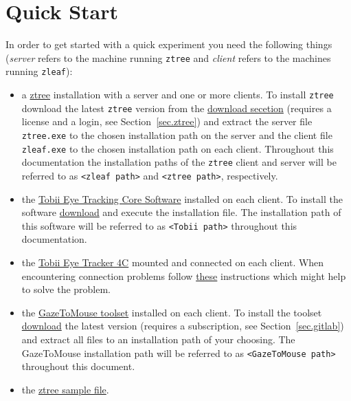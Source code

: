 \documentclass[a4paper,oneside]{book}
\begin{document}
\chapter{Quick Start}
\label{sec.quick}
In order to get started with a quick experiment you need the following things (\emph{server} refers to the machine running \texttt{ztree} and \emph{client} refers to the machines running \texttt{zleaf}):
\begin{itemize}
    \item a \href{http://www.ztree.uzh.ch/en.html}{ztree} installation with a server and one or more clients.
        To install \texttt{ztree} download the latest \texttt{ztree} version from the \href{https://www.uzh.ch/ztree/ssl-dir/index.php}{download secetion} (requires a license and a login, see Section~\ref{sec.ztree}) and extract the server file \texttt{ztree.exe} to the chosen installation path on the server and the client file \texttt{zleaf.exe} to the chosen installation path on each client.
        Throughout this documentation the installation paths of the \texttt{ztree} client and server will be referred to as \texttt{<zleaf path>} and \texttt{<ztree path>}, respectively.
    \item the \href{https://tobiigaming.com/getstarted/}{Tobii Eye Tracking Core Software} installed on each client.
        To install the software \href{https://tobiigaming.com/downloadlatest/?bundle=tobii-core}{download} and execute the installation file.
        The installation path of this software will be referred to as \texttt{<Tobii path>} throughout this documentation.
    \item the \href{https://tobiigaming.com/eye-tracker-4c/}{Tobii Eye Tracker 4C} mounted and connected on each client.
        When encountering connection problems follow \href{https://help.tobii.com/hc/en-us/articles/115000432589-Is-your-Eye-Tracker-4C-not-connecting-}{these} instructions which might help to solve the problem.
    \item the \href{http://tpf.fluido.as:10012/TBI/TBI-tobii_eye_tracker_gaze}{GazeToMouse toolset} installed on each client.
        To install the toolset \href{http://tpf.fluido.as:10012/TBI/TBI-tobii_eye_tracker_gaze/blob/master/release}{download} the latest version (requires a subscription, see Section~\ref{sec.gitlab}) and extract all files to an installation path of your choosing.
        The GazeToMouse installation path will be referred to as \texttt{<GazeToMouse path>} throughout this document.
    \item the \href{http://tpf.fluido.as:10012/TBI/TBI-tobii_eye_tracker_gaze/tree/master/sample}{ztree sample file}.
\end{itemize}
\end{document}
